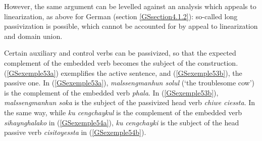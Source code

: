 \documentclass[output=paper]{langsci/langscibook}
\begin{document}
{\begin{exe}
    \label{GSexemple52}
\end{exe}

However, the same argument can be levelled against an analysis which appeals to linearization, as above for German (section \ref{GSsection4.1.2}): so-called long passivization is possible, which cannot be accounted for by appeal to linearization and domain union.

Certain auxiliary and control verbs can be passivized, so that the expected complement of the embedded verb becomes the subject of the construction. (\ref{GSexemple53a}) exemplifies the active sentence, and (\ref{GSexemple53b}), the passive one. In (\ref{GSexemple53a}), \textit{malssengmanhun solul} (`the troublesome cow’) is the complement of the embedded verb \textit{phala}. In (\ref{GSexemple53b}), \textit{malssengmanhun soka} is the subject of the passivized head verb \textit{chiwe ciessta}. In the same way, while \textit{ku cengchaykul} is the complement of the embedded verb \textit{sihaynghalako} in (\ref{GSexemple54a}), \textit{ku cengchayki} is the subject of the head passive verb \textit{cisitoyessta} in (\ref{GSexemple54b}).  

\begin{exe}
	\ex \label{GSexemple53} 
	\begin{xlist}
        \label{GSexemple53a}
		

\end{xlist}
\end{exe}}
\end{document}
